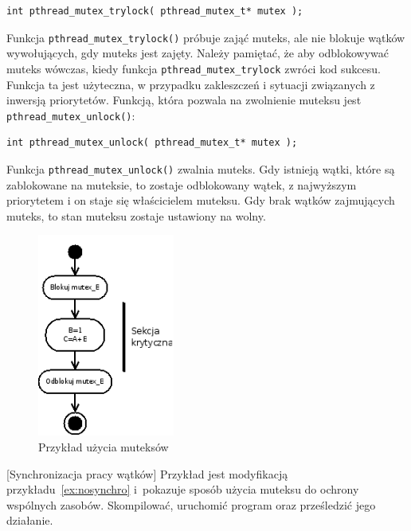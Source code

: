\begin{lstlisting}[style=MyCStyle]
int pthread_mutex_trylock( pthread_mutex_t* mutex );
\end{lstlisting}

Funkcja \lstinline[style=MyCStyle]{pthread_mutex_trylock()} próbuje zająć muteks, ale nie blokuje wątków wywołujących, gdy muteks jest zajęty. Należy pamiętać, że aby odblokowywać muteks wówczas, kiedy funkcja \lstinline[style=MyCStyle]{pthread_mutex_trylock} zwróci kod sukcesu. Funkcja ta jest użyteczna, w przypadku zakleszczeń i sytuacji związanych z inwersją priorytetów. Funkcją, która pozwala na zwolnienie muteksu jest \lstinline[style=MyCStyle]{pthread_mutex_unlock()}:

\begin{lstlisting}[style=MyCStyle]
int pthread_mutex_unlock( pthread_mutex_t* mutex );
\end{lstlisting}

Funkcja \lstinline[style=MyCStyle]{pthread_mutex_unlock()} zwalnia muteks. Gdy istnieją wątki, które są zablokowane na muteksie, to zostaje odblokowany wątek, z najwyższym priorytetem i on staje się właścicielem muteksu. Gdy brak wątków zajmujących muteks, to stan muteksu zostaje ustawiony na wolny. 

\begin{figure}[!h]
\centering
\includegraphics[width=0.4\textwidth]{img/thrd_mutex}
\caption{Przykład użycia muteksów}
\label{fig:mutex}
\end{figure}

\begin{example}{[Synchronizacja pracy wątków]}
Przykład jest modyfikacją przykładu~\ref{ex:nosynchro} i~pokazuje sposób użycia muteksu do ochrony wspólnych zasobów. Skompilować, uruchomić program oraz prześledzić jego działanie. 


\end{example}

